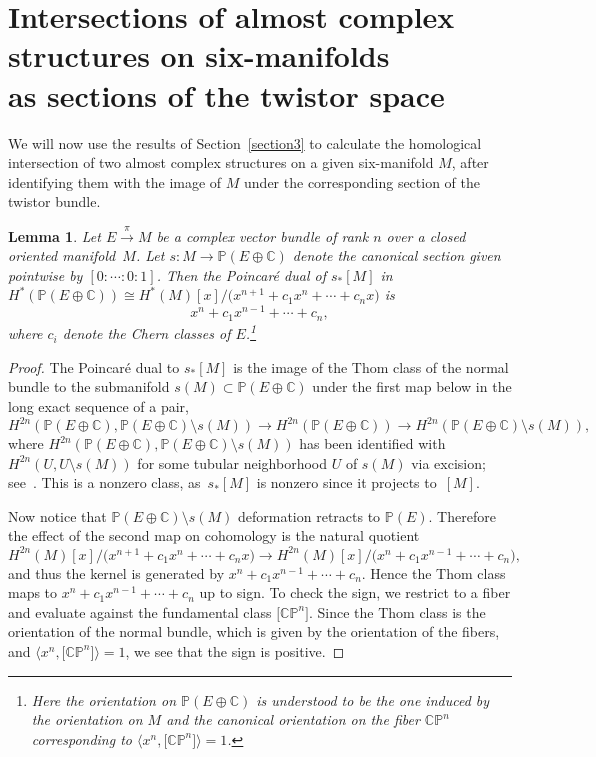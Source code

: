 \documentclass[pdftex]{sigma}%
\newcommand{\CP}{\mathbb{CP}}
\newcommand{\C}{\mathbb{C}}
\numberwithin{equation}{section}
\newtheorem{Lemma}[Theorem]{Lemma}
\begin{document}
\section[Intersections of almost complex structures on six-manifolds as sections of the twistor space]{Intersections of almost complex structures on six-manifolds\\ as sections of the twistor space}

We will now use the results of Section~\ref{section3} to calculate the homological intersection of two almost complex structures on a given six-manifold $M$, after identifying them with the image of $M$ under the corresponding section of the twistor bundle.

\begin{Lemma}\label{poincaredual}
Let $E \xrightarrow{\pi} M$ be a complex vector bundle of rank $n$ over a closed oriented mani\-fold~$M$. Let $s \colon M \to \mathbb{P}(E \oplus \C)$ denote the canonical section given pointwise by $[0: \cdots : 0 : 1]$.
Then the Poincar\'e dual of $s_*[M]$ in $H^*(\mathbb{P}(E\oplus \C)) \cong H^*(M)[x]/\big(x^{n+1} + c_1 x^n + \cdots + c_n x\big)$ is
\[
x^n + c_1x^{n-1} + \cdots + c_n,
\]
where $c_i$ denote the Chern classes of $E$.\footnote{Here the orientation on $\mathbb{P}(E\oplus \C)$ is understood to be the one induced by the orientation on $M$ and the canonical orientation on the fiber $\CP^n$ corresponding to $\langle x^n, \big[\CP^n\big] \rangle = 1$.}
\end{Lemma}
\begin{proof}
The Poincar\'e dual to $s_*[M]$ is the image of the Thom class of the normal bundle to the submanifold $s(M) \subset \mathbb{P}(E \oplus \C)$ under the first map below in the long exact sequence of a pair,
\[
H^{2n}(\mathbb{P}(E \oplus \C), \mathbb{P}(E \oplus \C) \setminus s(M)) \to H^{2n}(\mathbb{P}(E \oplus \C)) \to H^{2n} (\mathbb{P}(E \oplus \C) \setminus s(M)),
\]
where $H^{2n}(\mathbb{P}(E \oplus \C), \mathbb{P}(E \oplus \C) \setminus s(M))$ has been identified with $H^{2n}(U, U \setminus s(M))$ for some tubular neighborhood $U$ of $s(M)$ via excision; see~\cite[Section~6.11]{Br}. This is a nonzero class, as~$s_*[M]$ is nonzero since it projects to~$[M]$.

Now notice that $\mathbb{P}(E \oplus \C) \setminus s(M)$ deformation retracts to $\mathbb{P}(E)$. Therefore the effect of the second map on cohomology is the natural quotient
\[ H^{2n}(M)[x]/\big(x^{n+1} + c_1 x^n + \cdots + c_n x\big) \to H^{2n}(M)[x]/\big(x^n + c_1 x^{n-1} + \cdots + c_n\big), \]
and thus the kernel is generated by $x^n + c_1x^{n-1} + \cdots + c_n$. Hence the Thom class maps to $x^n + c_1x^{n-1} + \cdots + c_n$ up to sign. To check the sign, we restrict to a fiber and evaluate against the fundamental class $\big[\CP^n\big]$. Since the Thom class is the orientation of the normal bundle, which is given by the orientation of the fibers, and $\big\langle x^n, \big[\CP^n\big] \big\rangle = 1$, we see that the sign is positive. \end{proof}
\end{document}
